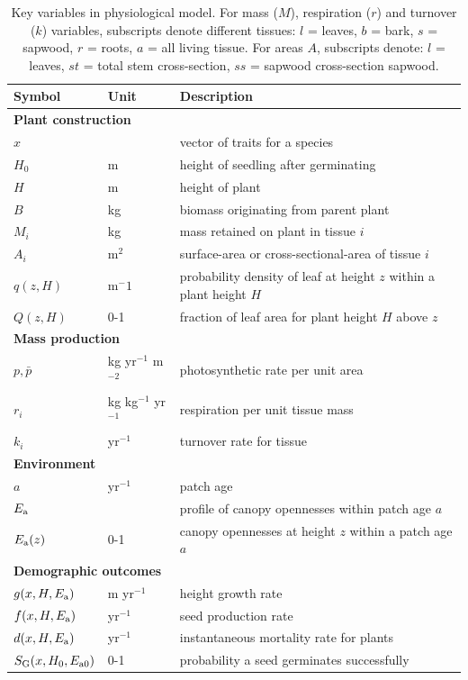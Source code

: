\documentclass[10pt,twoside]{article}
\begin{document}
\begin{table}[h!]
 \caption{Key variables in physiological model. For mass ($M$), respiration ($r$) and turnover ($k$)
 variables, subscripts denote different tissues: \(l\) = leaves, \(b\) = bark, \(s\) = sapwood,
 \(r\) = roots, \(a\) = all living tissue. For areas \(A\), subscripts denote: \(l\) = leaves, \(st\) = total stem cross-section, \(ss\) = sapwood cross-section sapwood.}
\centering
  \begin{tabular}{p{2cm}p{2.5cm}p{8cm}}
  \hline
  Symbol & Unit & Description \\
  \hline
  \multicolumn{3}{l}{\textbf{Plant construction}} \\
  $x$   & & vector of traits for a species\\
  $H_0$   & m  & height of seedling after germinating\\
  $H$   & m  & height of plant\\
  $B$   & kg  & biomass originating from parent plant\\
  $M_i$ & kg  & mass retained on plant in tissue $i$\\
  $A_i$ & m$^2$  & surface-area or cross-sectional-area of tissue $i$\\
  $q(z, H)$ & m$^-1$ & probability density of leaf at height $z$ within a plant height $H$\\
  $Q(z, H)$ & 0-1 & fraction of leaf area for plant height $H$ above $z$\\
  \multicolumn{3}{l}{\textbf{Mass production}} \\
  $p,\bar{p}$ & kg yr$^{-1}$ m$^{-2}$  & photosynthetic rate per unit area \\
  $r_i$ & kg kg$^{-1}$ yr$^{-1}$ & respiration per unit tissue mass \\
  $k_i$ & yr$^{-1}$ & turnover rate for tissue \\
  \multicolumn{3}{l}{\textbf{Environment}} \\
  $a$ & yr$^{-1}$ & patch age\\
  $E_{\rm a}$ & & profile of canopy opennesses within patch age $a$\\
  $E_{\rm a}(z)$& 0-1 & canopy opennesses at height $z$ within a patch age $a$\\
  \multicolumn{3}{l}{\textbf{Demographic outcomes}} \\
  $g(x, H, E_{\rm a})$ & m yr$^{-1}$ & height growth rate \\
  $f(x, H, E_{\rm a})$ & yr$^{-1}$ & seed production rate \\
  $d(x, H, E_{\rm a})$ & yr$^{-1}$ & instantaneous mortality rate for plants\\
  $S_{\rm G} (x, H_0, E_{{\rm a}0})$ & 0-1 & probability a seed germinates successfully \\
  \hline
  \end{tabular}
\label{tab:definitions}
\end{table}
\end{document}
